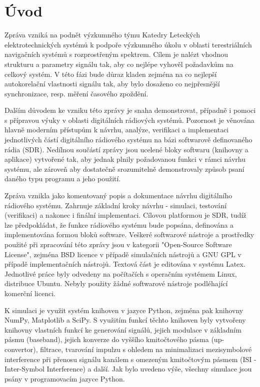 \section{Úvod}


\marginpar{\textcolor{txt_blue}{Hlavní cíl zprávy}} 
Zpráva vzniká na podnět výzkumného týmu Katedry Leteckých elektrotechnických systémů k podpoře výzkumného úkolu v oblasti terestriálních navigačních systémů s rozprostřeným spektrem. Cílem je nalézt vhodnou strukturu a parametry signálu tak, aby co nejlépe vyhověl požadavkům na celkový systém. V této fázi bude důraz kladen zejména na co nejlepší autokorelační vlastnosti signálu tak, aby bylo dosaženo co nejpřesnější synchronizace, resp. měření časového zpoždění.

\marginpar{\textcolor{txt_blue}{Sekundární cíl zprávy}} 
Dalším důvodem ke vzniku této zprávy je snaha demonstrovat, případně i pomoci s přípravou výuky v oblasti digitálních rádiových systémů. Pozornost je věnována hlavně moderním přístupům k návrhu, analýze, verifikaci a implementaci jednotlivých částí digitálního rádiového systému na bázi softwarově definovaného rádia (SDR). Nedílnou součástí zprávy jsou ucelené bloky softwaru (knihovny a aplikace) vytvořené tak, aby jednak plnily požadovanou funkci v rámci návrhu systému, ale zároveň aby dostatečně srozumitelně demonstrovaly způsob psaní daného typu programu a jeho použití. 

\marginpar{\textcolor{txt_blue}{Použité prostředky}} 
Zpráva vznikla jako komentovaný popis a dokumentace návrhu digitálního rádiového systému. Zahrnuje základní kroky návrhu - simulaci, testování (verifikaci) a nakonec i finální implementaci. Cílovou platformou je SDR, tudíž lze předpokládat, že funkce rádiového systému bude popsána, definována a implementována formou bloků software. Veškeré softwarové nástroje a prostředky použité při zpracování této zprávy jsou v kategorii "Open-Source Software License", zejména BSD licence v případě simulačních nástrojů a GNU GPL v případě implementačních nástrojů. Textová část je editována v systému Latex. Jednotlivé práce byly odvedeny na počítačích s operačním systémem Linux, distribuce Ubuntu. Nebyly použity žádné softwarové nástroje podléhající komerční licenci.

K simulaci je využit systém knihoven v jazyce Python, zejména pak knihovny NumPy, Matplotlib a SciPy. S využitím funkcí těchto knihoven byly vytvořeny knihovny vlastních funkcí ke generování signálů, jejich modulace v základním pásmu (baseband), jejich konverze do vyššího kmitočtového pásma (up-convertor), filtrace, tvarování impulzu s ohledem na minimalizaci mezisymbolové interference při přenosu signálu kanálem s omezeným kmitočtovým pásmem (ISI - Inter-Symbol Interference) a další. Jak bylo uvedeno výše, všechny simulace jsou psány v programovacím jazyce Python.

